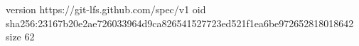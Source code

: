 version https://git-lfs.github.com/spec/v1
oid sha256:23167b20e2ae726033964d9ca826541527723ed521f1ea6be972652818018642
size 62
